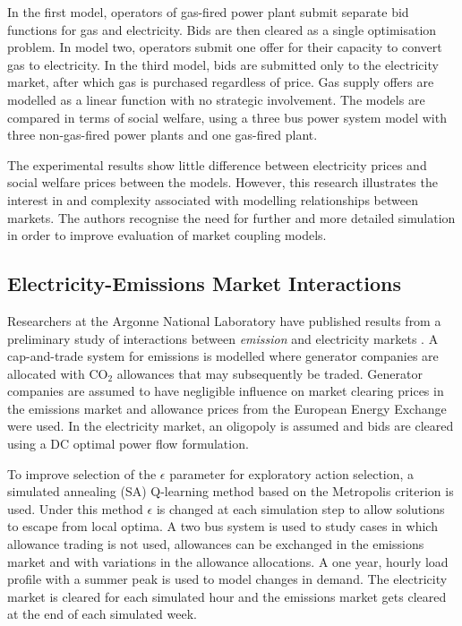In the first model, operators of gas-fired power plant submit separate bid
functions for gas and electricity.  Bids are then cleared as a single
optimisation problem.  In model two, operators submit one offer for their
capacity to convert gas to electricity.  In the third model, bids are
submitted only to the electricity market, after which gas is purchased
regardless of price.  Gas supply offers are modelled as a linear function with
no strategic involvement.  The models are compared in terms of social welfare,
using a three bus power system model with three non-gas-fired power plants and
one gas-fired plant.

The experimental results show little difference between electricity prices and
social welfare prices between the models.  However, this research illustrates
the interest in and complexity associated with modelling relationships between
markets.  The authors recognise the need for further and more detailed
simulation in order to improve evaluation of market coupling models.

\subsection{Electricity-Emissions Market Interactions}
Researchers at the Argonne National Laboratory have published results from a
preliminary study of interactions between \textit{emission} and electricity
markets \cite{wang:09}.  A cap-and-trade system for emissions is modelled where
generator companies are allocated with $\mbox{CO}_2$ allowances that may
subsequently be traded.  Generator companies are assumed to have negligible
influence on market clearing prices in the emissions market and allowance
prices from the European Energy Exchange were used.  In the electricity market,
an oligopoly is assumed and bids are cleared using a DC optimal power flow
formulation.

To improve selection of the $\epsilon$ parameter for exploratory
action selection, a simulated annealing (SA) Q-learning method based on the
Metropolis criterion \cite{guo:sa} is used.  Under this method $\epsilon$ is
changed at each simulation step to allow solutions to escape from local
optima.  A two bus system is used to study cases in which allowance trading
is not used, allowances can be exchanged in the emissions market and with
variations in the allowance allocations.  A one year, hourly load profile with
a summer peak is used to model changes in demand.  The electricity market is
cleared for each simulated hour and the emissions market gets cleared at the
end of each simulated week.


